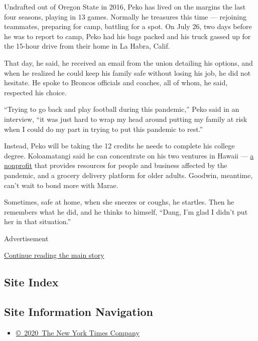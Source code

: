 Undrafted out of Oregon State in 2016, Peko has lived on the margins the
last four seasons, playing in 13 games. Normally he treasures this time
--- rejoining teammates, preparing for camp, battling for a spot. On
July 26, two days before he was to report to camp, Peko had his bags
packed and his truck gassed up for the 15-hour drive from their home in
La Habra, Calif.

That day, he said, he received an email from the union detailing his
options, and when he realized he could keep his family safe without
losing his job, he did not hesitate. He spoke to Broncos officials and
coaches, all of whom, he said, respected his choice.

``Trying to go back and play football during this pandemic,'' Peko said
in an interview, ``it was just hard to wrap my head around putting my
family at risk when I could do my part in trying to put this pandemic to
rest.''

Instead, Peko will be taking the 12 credits he needs to complete his
college degree. Koloamatangi said he can concentrate on his two ventures
in Hawaii --- \href{https://www.hawaiitowardszero.org/}{a nonprofit}
that provides resources for people and business affected by the
pandemic, and a grocery delivery platform for older adults. Goodwin,
meantime, can't wait to bond more with Marae.

Sometimes, safe at home, when she sneezes or coughs, he startles. Then
he remembers what he did, and he thinks to himself, ``Dang, I'm glad I
didn't put her in that situation.''

Advertisement

\protect\hyperlink{after-bottom}{Continue reading the main story}

\hypertarget{site-index}{%
\subsection{Site Index}\label{site-index}}

\hypertarget{site-information-navigation}{%
\subsection{Site Information
Navigation}\label{site-information-navigation}}

\begin{itemize}
\tightlist
\item
  \href{https://help.nytimes.com/hc/en-us/articles/115014792127-Copyright-notice}{©~2020~The
  New York Times Company}
\end{itemize}

